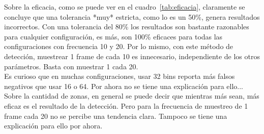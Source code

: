 \documentclass[14pt,letterpaper,hidelinks]{extarticle}
\begin{document}
Sobre la eficacia, como se puede ver en el cuadro~\ref{tab:eficacia}, claramente se concluye que una tolerancia *muy* estricta, como lo es un 50\%, genera resultados incorrectos. Con una tolerancia del 80\% los resultados son bastante razonables para cualquier configuración, es más, son 100\% eficaces para todas las configuraciones con frecuencia 10 y 20. Por lo mismo, con este método de detección, muestrear 1 frame de cada 10 es innecesario, independiente de los otros parámetros. Basta con muestrar 1 cada 20.\\

Es curioso que en muchas configuraciones, usar 32 bins reporta más falsos negativos que usar 16 o 64. Por ahora no se tiene una explicación para ello...\\

Sobre la cantidad de zonas, en general se puede decir que mientras más sean, más eficaz es el resultado de la detección. Pero para la frecuencia de muestreo de 1 frame cada 20 no se percibe una tendencia clara. Tampoco se tiene una explicación para ello por ahora.
\newpage
 
\end{document}
